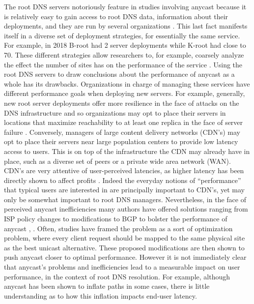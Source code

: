 \documentclass[sigconf,nonacm,10pt]{acmart}
\begin{document}
The root DNS servers notoriously feature in studies involving anycast
because it is relatively easy to gain access to root DNS data,
information about their deployments, and they are run by several
organizations \cite{root_servers}. This last fact manifests itself in a
diverse set of deployment strategies, for essentially the same service.
For example, in 2018 B-root had 2 server deployments while K-root had
close to 70. These different strategies allow researchers to, for
example, coarsely analyze the effect the number of sites has on the
performance of the service \cite{li_levin_spring_bhattacharjee_2018}.
\break \break
Using the root DNS servers to draw conclusions about the performance of
anycast as a whole has its drawbacks. Organizations in charge of
managing these services have different performance goals when deploying
new servers. For example, generally, new root server deployments offer
more resilience in the face of attacks on the DNS infrastructure and so
organizations may opt to place their servers in locations that maximize
reachability to at least one replica in the face of server failure
\cite{moura2016anycast}. Conversely, managers of large content delivery
networks (CDN's) may opt to place their servers near large population
centers to provide low latency access to users. This is on top of the
infrastructure the CDN may already have in place, such as a diverse set
of peers or a private wide area network (WAN). CDN's are very attentive
of user-perceived latencies, as higher latency has been directly shown
to affect profits \cite{linden}. Indeed the everyday notions of
``performance'' that typical users are interested in are principally
important to CDN's, yet may only be somewhat important to root DNS
managers. \break
Nevertheless, in the face of perceived anycast inefficiencies many
authors have offered solutions ranging from ISP policy changes to
modifications to BGP to bolster the performance of anycast
\cite{li_levin_spring_bhattacharjee_2018},
\cite{huawei_evaluating_anycast}. Often, studies have framed the problem
as a sort of optimization problem, where every client request should be
mapped to the same physical site as the best unicast alternative. These
proposed modifications are then shown to push anycast closer to optimal
performance. \break \break
However it is not immediately clear that anycast's problems and
inefficiencies lead to a measurable impact on user performance, in the
context of root DNS resolution. For example, although anycast has been
shown to inflate paths in some cases, there is little understanding as
to how this inflation impacts end-user latency.
\end{document}
